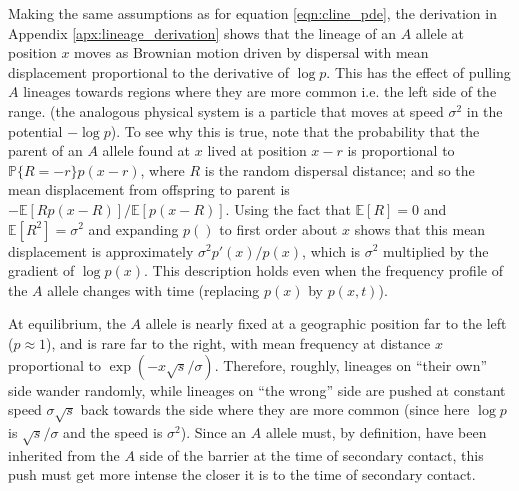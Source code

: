 \documentclass[11pt,letterpaper]{article}
\newcommand{\alisa}[1]{{\em \color{red} #1}}
\newcommand{\plr}[1]{{\em \color{blue} #1}}
\newcommand{\E}{\mathbb{E}}
\renewcommand{\P}{\mathbb{P}}
\newcommand{\grad}{\nabla}
\begin{document}
Making the same assumptions as for equation \eqref{eqn:cline_pde}, the derivation in Appendix \ref{apx:lineage_derivation} shows 
that the lineage of an $A$ allele at position $x$ moves as Brownian motion driven by dispersal
with mean displacement proportional to the derivative of $\log p$.
This has the effect of pulling $A$ lineages towards regions where they are more common i.e. the left side of the range.   
(the analogous physical system is a particle that moves at speed $\sigma^2$ in the potential $-\log p$). 
To see why this is true, note that the probability that the parent of an $A$ allele found at $x$
lived at position $x-r$ is proportional to $\P\{R=-r\} p(x-r)$, where $R$ is the random dispersal distance;
and so the mean displacement from offspring to parent is $-\E[R p(x-R)]/\E[p(x-R)]$.  
Using the fact that $\E[R]=0$ and $\E[R^2]=\sigma^2$ 
and expanding $p()$ to first order about $x$ shows that this mean displacement is approximately $\sigma^2 p'(x)/p(x)$,
which is $\sigma^2$ multiplied by the gradient of $\log p(x)$.
This description holds even when the frequency profile of the $A$ allele changes with time (replacing $p(x)$ by $p(x,t)$).

At equilibrium, the $A$ allele is nearly fixed at a geographic position far to the left ($p \approx 1$),
and is rare far to the right, with mean frequency at distance $x$ proportional to $\exp(-x\sqrt{s}/\sigma)$.
Therefore, roughly, lineages on ``their own'' side wander randomly,
while lineages on ``the wrong'' side are pushed at constant speed $\sigma\sqrt{s}$ 
back towards the side where they are more common
(since here $\log p$ is $\sqrt{s}/\sigma$ and the speed is $\sigma^2$). 
Since an $A$ allele must, by definition, have been inherited from the $A$ side of the barrier 
at the time of secondary contact, this push must get more intense the closer it is to the time of secondary contact.
\end{document}

